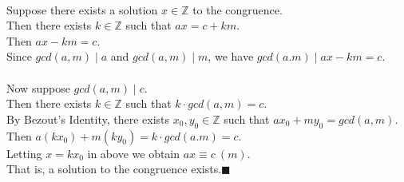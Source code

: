 \documentclass[letterpaper,12pt,oneside,onecolumn]{report}
\begin{document}
\paragraph{}
Suppose there exists a solution $x \in \mathbb{Z}$ to the congruence.\\
Then there exists $k \in \mathbb{Z}$ such that $ax = c + km$.\\
Then $ax - km = c$.\\
Since $gcd(a,m) \mid a$ and $gcd(a,m) \mid m$, we have $gcd(a.m) \mid ax - km = c$.
\paragraph{}
Now suppose $gcd(a,m) \mid c$.\\
Then there exists $k \in \mathbb{Z}$ such that $k \cdot gcd(a,m) = c$.\\
By Bezout's Identity, there exists $x_0, y_0 \in \mathbb{Z}$ such that $ax_0 + my_0 = gcd(a,m)$.\\
Then $a(kx_0) + m(ky_0) = k\cdot gcd(a.m) = c$.\\
Letting $x = kx_0$ in above we obtain $ax \equiv c\ (m)$.\\
That is, a solution to the congruence exists.$\blacksquare$
\end{document}

